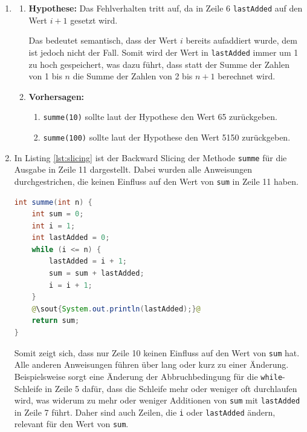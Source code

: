 \documentclass[12pt]{scrartcl}
\begin{document}


\begin{enumerate}[label=(\alph*)]
  \item {
        \begin{enumerate}[label=\roman*.]
          \item \textbf{Hypothese:}
                Das Fehlverhalten tritt auf, da in Zeile 6 \texttt{lastAdded} auf den Wert $i + 1$ gesetzt wird.

                Das bedeutet semantisch, dass der Wert $i$ bereits aufaddiert wurde, dem ist jedoch nicht der Fall. Somit wird der Wert in \texttt{lastAdded} immer um 1 zu hoch gespeichert, was dazu führt, dass statt der Summe der Zahlen von 1 bis $n$ die Summe der Zahlen von 2 bis $n + 1$ berechnet wird.
          \item \textbf{Vorhersagen:} {
                  \begin{enumerate}[label=\arabic*.]
                    \item \texttt{summe(10)} sollte laut der Hypothese den Wert 65 zurückgeben.
                    \item \texttt{summe(100)} sollte laut der Hypothese den Wert 5150 zurückgeben.
                  \end{enumerate}
                }
        \end{enumerate}
        }
  \item {
        In Listing \ref{lst:slicing} ist der Backward Slicing der Methode \texttt{summe} für die Ausgabe in Zeile 11 dargestellt. Dabei wurden alle Anweisungen durchgestrichen, die keinen Einfluss auf den Wert von \texttt{sum} in Zeile 11 haben.
        \begin{lstlisting}[language=Java, caption={Backward Slicing für Zeile 11}, label={lst:slicing}, escapechar=@]
int summe(int n) {
    int sum = 0;
    int i = 1;
    int lastAdded = 0;
    while (i <= n) {
        lastAdded = i + 1;
        sum = sum + lastAdded;
        i = i + 1;
    }
    @\sout{System.out.println(lastAdded);}@
    return sum;
}
        \end{lstlisting}
        }
        Somit zeigt sich, dass nur Zeile 10 keinen Einfluss auf den Wert von \texttt{sum} hat. Alle anderen Anweisungen führen über lang oder kurz zu einer Änderung. Beispielsweise sorgt eine Änderung der Abbruchbedingung für die \texttt{while}-Schleife in Zeile 5 dafür, dass die Schleife mehr oder weniger oft durchlaufen wird, was widerum zu mehr oder weniger Additionen von \texttt{sum} mit \texttt{lastAdded} in Zeile 7 führt. Daher sind auch Zeilen, die \texttt{i} oder \texttt{lastAdded} ändern, relevant für den Wert von \texttt{sum}.


\end{enumerate}
\end{document}
